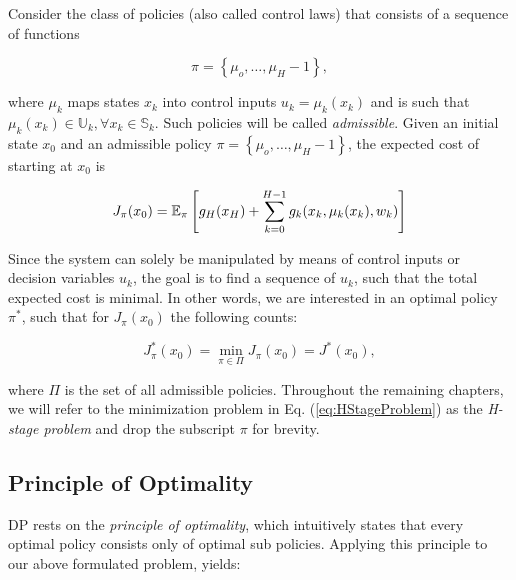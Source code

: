 Consider the class of policies (also called control laws) that consists of a
sequence of functions 

\begin{equation}
  \pi = \left\{\mu_o,\dots,\mu_H-1\right\},
\end{equation}

where $\mu_k$ maps states $x_k$ into control inputs $u_k = \mu_k(x_k)$ and is
such that $\mu_k(x_k) \in \mathbb{U}_k, \forall x_k \in \mathbb{S}_k$. Such
policies will be called \textit{admissible}. Given an initial state $x_0$ and an
admissible policy $\pi = \left\{\mu_o,\dots,\mu_H-1\right\}$, the expected cost
of starting at $x_0$ is

\begin{equation}
  J_\pi(x_0) = \mathbb{E}_\pi\left[g_H(x_H) + \sum\limits_{k=0}^{H-1}{g_k(x_k, \mu_k(x_k), w_k)}\right]
\end{equation}

Since the system can solely be manipulated by means of control inputs or
decision variables $u_k$, the goal is to find a sequence of $u_k$, such that the
total expected cost is minimal. In other words, we are interested in an optimal
policy $\pi^*$, such that for $J_\pi(x_0)$ the following counts:

\begin{equation}
  J_\pi^*(x_0) = \min_{\pi\in\Pi}J_\pi(x_0) = J^*(x_0), \label{eq:HStageProblem}
\end{equation}

where $\Pi$ is the set of all admissible policies. Throughout the remaining
chapters, we will refer to the minimization problem in Eq.
(\ref{eq:HStageProblem}) as the \textit{H-stage problem} and drop the subscript
$\pi$ for brevity.

\subsection*{Principle of Optimality}
DP rests on the \textit{principle of optimality}, which intuitively states that
every optimal policy consists only of optimal sub policies. Applying this
principle to our above formulated problem, yields: 

\begin{center}
\end{center}


